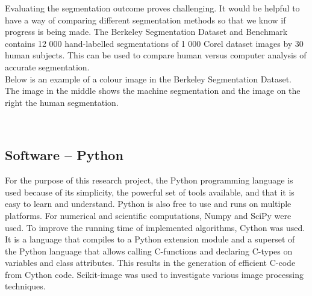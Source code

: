 \documentclass[a4paper,10pt]{article}
\begin{document}
Evaluating the segmentation outcome proves challenging.  It would be helpful to have a way of comparing
different
segmentation methods so that we know if progress is being made. 
The Berkeley Segmentation Dataset and Benchmark \cite{dataset} contains 12 000 hand-labelled
segmentations of 1 000 Corel dataset images by 30 human subjects. 
This can be used to compare human versus computer analysis of accurate segmentation. \\

Below is an example of a colour image in the Berkeley Segmentation Dataset.  The image in the middle shows the machine segmentation and the
image on the right the human segmentation.

\begin{figure}[H]
\centering
\mbox{ \quad
{} \quad
{}}
\end{figure}

\subsection{Software -- Python}
For the purpose of this research project, the Python programming language is
used because of its simplicity, the powerful set of tools
available, and that it is easy to learn and understand.  Python is
also free to use and runs on multiple platforms.  For numerical and
scientific computations, Numpy and SciPy were used.
To improve the running time of implemented algorithms, Cython was used.  It is a
language that compiles to a Python extension module and a superset of the
Python language that allows calling C-functions and declaring C-types on
variables and class attributes.  This
results in the generation of efficient C-code from Cython code.
Scikit-image was used to investigate various image processing
techniques. \\
\end{document}
